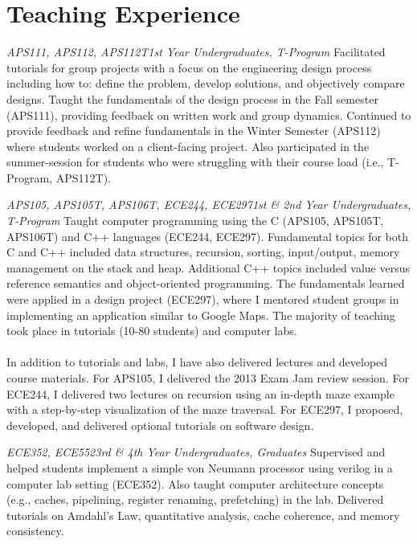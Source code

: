 \section{\sc Teaching Experience}

{\textit{APS111, APS112, APS112T}}{\textit{1st Year Undergraduates, T-Program}}
{
  Facilitated tutorials for group projects with a focus on the engineering design process including how to: define the problem, develop solutions, and objectively compare designs.
  Taught the fundamentals of the design process in the Fall semester (APS111), providing feedback on written work and group dynamics.
  Continued to provide feedback and refine fundamentals in the Winter Semester (APS112) where students worked on a client-facing project.
  Also participated in the summer-session for students who were struggling with their course load (i.e., T-Program, APS112T).
}

{\textit{APS105, APS105T, APS106T, ECE244, ECE297}}{\textit{1st \& 2nd Year Undergraduates, T-Program}}
{
  Taught computer programming using the C (APS105, APS105T, APS106T) and C++ languages (ECE244, ECE297).
  Fundamental topics for both C and C++ included data structures, recursion, sorting, input/output, memory management on the stack and heap.
  Additional C++ topics included value versus reference semantics and object-oriented programming.
  The fundamentals learned were applied in a design project (ECE297), where I mentored student groups in implementing an application similar to Google Maps.
  The majority of teaching took place in tutorials (10-80 students) and computer labs.
  \\
  \\
  In addition to tutorials and labs, I have also delivered lectures and developed course materials.
  For APS105, I delivered the 2013 Exam Jam review session.
  For ECE244, I delivered two lectures on recursion using an in-depth maze example with a step-by-step visualization of the maze traversal.
  For ECE297, I proposed, developed, and delivered optional tutorials on software design.
}

{\textit{ECE352, ECE552}}{\textit{3rd \& 4th Year Undergraduates, Graduates}}
{
  Supervised and helped students implement a simple von Neumann processor using verilog in a computer lab setting (ECE352).
  Also taught computer architecture concepts (e.g., caches, pipelining, register renaming, prefetching) in the lab.
  Delivered tutorials on Amdahl's Law, quantitative analysis, cache coherence, and memory consistency.
}

